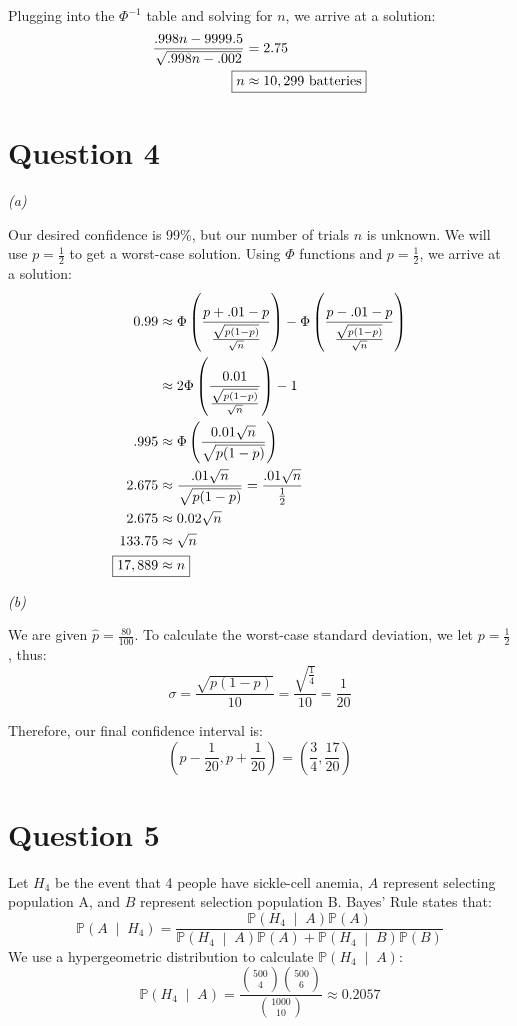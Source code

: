 \documentclass[titlepage, 12pt, leqno]{article}
\begin{document}
Plugging into the $\Phi^{-1}$ table and solving for $n$, we arrive at a solution:
\begin{align*}
    \frac{.998n - 9999.5}{\sqrt{.998n-.002}} &= 2.75 \\
    \Aboxed{n &\approx 10,299 \text{ batteries}} 
\end{align*}

\pagebreak
\section{Question 4}
\textit{(a)} 

Our desired confidence is 99\%, but our number of trials $n$ is unknown. We will
use $p = \frac{1}{2} $ to get a worst-case solution. Using $\Phi$ functions and
$p = \frac{1}{2} $, we arrive at a solution:
\begin{align*}
    0.99 &\approx \Phi\left(\frac{p+.01-p}{\frac{\sqrt{p(1-p)}}{\sqrt{n}} }\right)
    - \Phi\left(\frac{p-.01-p}{\frac{\sqrt{p(1-p)}}{\sqrt{n}} }\right) \\
         &\approx 2\Phi\left(\frac{0.01}{\frac{\sqrt{p(1-p)}}{\sqrt{n}} }\right)
         -1 \\
    .995 &\approx \Phi\left(\frac{0.01\sqrt{n}}{\sqrt{p(1-p)}}\right) \\
        2.675 &\approx \frac{.01\sqrt{n}}{\sqrt{p(1-p)}} = \frac{
        .01\sqrt{n}}{\frac{1}{2} } \\
        2.675 &\approx 0.02\sqrt{n} \\
        133.75 &\approx \sqrt{n} \\
        \Aboxed{17,889 &\approx n} 
\end{align*}

\textit{(b)} 

We are given $\hat p = \frac{80}{100} $. To calculate the worst-case standard
deviation, we let $p = \frac{1}{2} $, thus:
\[
 \sigma = \frac{\sqrt{p(1-p)}}{10} = \frac{\sqrt{\frac{1}{4} }}{10} =
 \frac{1}{20} 
\]

Therefore, our final confidence interval is:
\[
    \left(p-\frac{1}{20}, p+\frac{1}{20} \right) = 
    \boxed{\left(\frac{3}{4}, \frac{17}{20} \right) }
\]

\pagebreak
\section{Question 5}
Let $H_4$ be the event that 4 people have sickle-cell anemia, $A$ represent
selecting population A, and $B$ represent selection population B. Bayes' Rule
states that:
\[
\mathbb{P}\left(A \;\middle|\; H_4\right) = \frac{
\mathbb{P}\left(H_4 \;\middle|\; A\right) \mathbb{P}(A)}{
\mathbb{P}\left(H_4 \;\middle|\; A\right) \mathbb{P}(A) + 
\mathbb{P}\left(H_4 \;\middle|\; B\right) \mathbb{P}(B)} 
\]
We use a hypergeometric distribution to calculate $ \mathbb{P}\left(H_4 
\;\middle|\; A\right) $:
\[
\mathbb{P}\left(H_4 \;\middle|\; A\right) = \frac{
 \binom{500}{4}\binom{500}{6}}{\binom{1000}{10}} \approx 0.2057
\]
\end{document}
